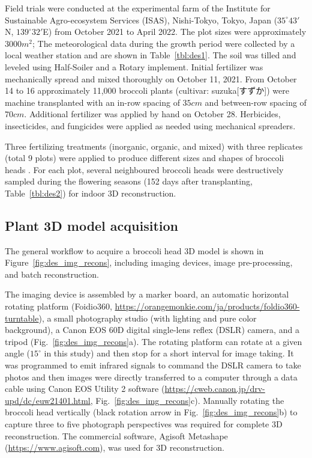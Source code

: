 Field trials were conducted at the experimental farm of the Institute for Sustainable Agro-ecosystem Services (ISAS), Nishi-Tokyo, Tokyo, Japan ($35^\circ 43'$N, $139^\circ 32'$E) from October 2021 to April 2022. The plot sizes were approximately $3000 m^2$; The meteorological data during the growth period were collected by a local weather station and are shown in Table~\ref{tbl:des1}. The soil was tilled and leveled using Half-Soiler and a Rotary implement. Initial fertilizer was mechanically spread and mixed thoroughly on October 11, 2021. From October 14 to 16 approximately 11,000 broccoli plants (cultivar: suzuka[すずか]) were machine transplanted with an in-row spacing of $35 cm$ and between-row spacing of $70 cm$. Additional fertilizer was applied by hand on October 28. Herbicides, insecticides, and fungicides were applied as needed using mechanical spreaders.



Three fertilizing treatments (inorganic, organic, and mixed) with three replicates (total 9 plots) were applied to produce different sizes and shapes of broccoli heads \citep{nishida_estimation_2023}. For each plot, several neighboured broccoli heads were destructively sampled during the flowering seasons (152 days after transplanting, Table~\ref{tbl:des2}) for indoor 3D reconstruction. 



\subsection{Plant 3D model acquisition}

The general workflow to acquire a broccoli head 3D model is shown in Figure~\ref{fig:des_img_recons}, including imaging devices, image pre-processing, and batch reconstruction.



The imaging device is assembled by a marker board, an automatic horizontal rotating platform (Foidio360, \url{https://orangemonkie.com/ja/products/foldio360-turntable}), a small photography studio (with lighting and pure color background), a Canon EOS 60D digital single-lens reflex (DSLR) camera, and a tripod (Fig.~\ref{fig:des_img_recons}a). The rotating platform can rotate at a given angle ($15^\circ$ in this study) and then stop for a short interval for image taking. It was programmed to emit infrared signals to command the DSLR camera to take photos and then images were directly transferred to a computer through a data cable using Canon EOS Utility 2 software (\url{https://cweb.canon.jp/drv-upd/dc/euw21401.html}, Fig.~\ref{fig:des_img_recons}c). Manually rotating the broccoli head vertically (black rotation arrow in Fig.~\ref{fig:des_img_recons}b) to capture three to five photograph perspectives was required for complete 3D reconstruction. The commercial software, Agisoft Metashape (\url{https://www.agisoft.com}), was used for 3D reconstruction.

